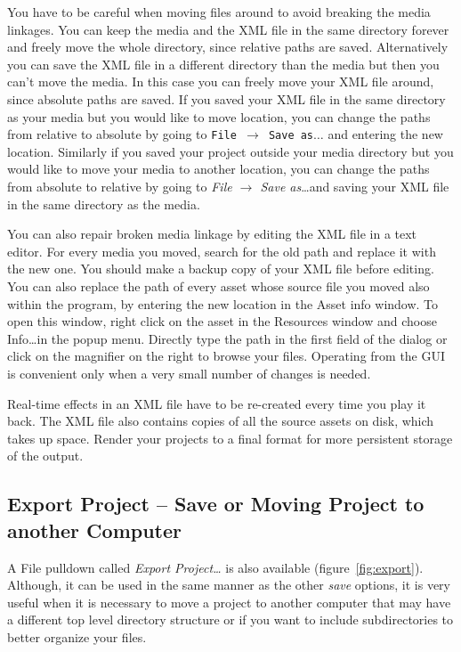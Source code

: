 You have to be careful when moving files around to avoid breaking the media linkages. You can keep the media and the XML file in the same directory forever and freely move the whole directory, since relative paths are saved. Alternatively you can save the XML file in a different directory than the media but then you can't move the media. In this case you can freely move your XML file around, since absolute paths are saved. If you saved your XML file in the same directory as your media but you would like to move location, you can change the paths from relative to absolute by going
to \texttt{File $\rightarrow$ Save as}$\dots$ and entering the new location. Similarly if you saved your project outside your media directory but you would like to move your media to another location, you can change the paths from absolute to relative by going to \textit{File $\rightarrow$ Save as}\dots and saving your XML file in the same directory as the media.

You can also repair broken media linkage by editing the XML file in a text editor. For every media you moved, search for the old path and replace it with the new one. You should make a backup copy of your XML file before editing. You can also replace the path of every asset whose source file you moved also within the program, by entering the new location in the Asset info window. To open this window, right click on the asset in the Resources window and choose Info\dots in the popup menu. Directly type the path in the first field of the dialog or click on the magnifier on the right to browse your files. Operating
from the GUI is convenient only when a very small number of changes is needed.

Real-time effects in an XML file have to be re-created every time you play it back. The XML file also contains copies of all the source assets on disk, which takes up space.  Render your projects to a final format for more persistent storage of the output.

\subsection{Export Project – Save or Moving Project to another Computer}%
\label{sub:export_project}

A File pulldown called \textit{Export Project\dots} is also available (figure~\ref{fig:export}).  Although, it can be used in the same manner as the other \textit{save} options, it is very useful when it is necessary to move a project to another computer that may have a different top level directory structure or if you want to include subdirectories to better organize your files.  

